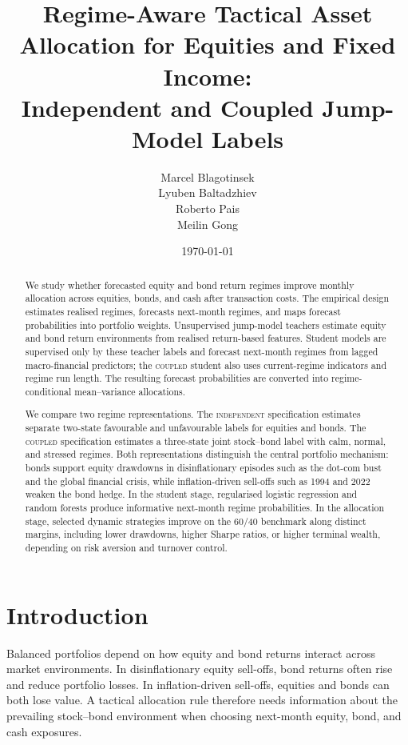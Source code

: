 \documentclass[10pt]{article}
\title{Regime-Aware Tactical Asset Allocation for Equities and Fixed Income:\\
Independent and Coupled Jump-Model Labels}
\author{%
Marcel Blagotinsek\\
Lyuben Baltadzhiev\\
Roberto Pais\\
Meilin Gong\\
\vspace{1pt}
}
\date{\today}
\newcommand{\Acoup}{\textsc{coupled}}
\newcommand{\Bindep}{\textsc{independent}}
\begin{document}
\maketitle
\thispagestyle{empty}


\begin{abstract}
    \noindent We study whether forecasted equity and bond return regimes improve monthly allocation across equities, bonds, and cash after transaction costs. The empirical design estimates realised regimes, forecasts next-month regimes, and maps forecast probabilities into portfolio weights. Unsupervised jump-model teachers estimate equity and bond return environments from realised return-based features. Student models are supervised only by these teacher labels and forecast next-month regimes from lagged macro-financial predictors; the \Acoup{} student also uses current-regime indicators and regime run length. The resulting forecast probabilities are converted into regime-conditional mean--variance allocations.

    \noindent We compare two regime representations. The \Bindep{} specification estimates separate two-state favourable and unfavourable labels for equities and bonds. The \Acoup{} specification estimates a three-state joint stock--bond label with calm, normal, and stressed regimes. Both representations distinguish the central portfolio mechanism: bonds support equity drawdowns in disinflationary episodes such as the dot-com bust and the global financial crisis, while inflation-driven sell-offs such as 1994 and 2022 weaken the bond hedge. In the student stage, regularised logistic regression and random forests produce informative next-month regime probabilities. In the allocation stage, selected dynamic strategies improve on the 60/40 benchmark along distinct margins, including lower drawdowns, higher Sharpe ratios, or higher terminal wealth, depending on risk aversion and turnover control.
\end{abstract}

\section{Introduction}

Balanced portfolios depend on how equity and bond returns interact across market environments. In disinflationary equity sell-offs, bond returns often rise and reduce portfolio losses. In inflation-driven sell-offs, equities and bonds can both lose value. A tactical allocation rule therefore needs information about the prevailing stock--bond environment when choosing next-month equity, bond, and cash exposures.
\end{document}
